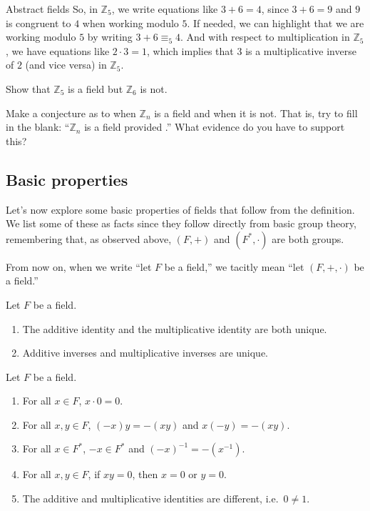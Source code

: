 \begin{section}{Abstract fields}
So, in $\mathbb{Z}_5$, we write equations like $3+6 = 4$, since $3+6 = 9$ and $9$ is congruent to $4$ when working modulo $5$. If needed, we can highlight that we are working modulo $5$ by writing  $3+6 \equiv_5 4$. And with respect to multiplication in $\mathbb{Z}_5$, we have equations like $2\cdot3 = 1$, which implies that $3$ is a multiplicative inverse of $2$ (and vice versa) in $\mathbb{Z}_5$.

\begin{problem}
Show that $\mathbb{Z}_5$ is a field but $\mathbb{Z}_6$ is not.
\end{problem}

\begin{problem}\label{prob.ConjectureZn}
Make a conjecture as to when $\mathbb{Z}_n$ is a field and when it is not. That is, try to fill in the blank: ``$\mathbb{Z}_n$ is a field provided .'' What evidence do you have to support this?
\end{problem}

\subsection{Basic properties}

Let's now explore some basic properties of fields that follow from the definition. We list some of these as facts since they follow directly from basic group theory, remembering that, as observed above, $(F,+)$ and $(F^*,\cdot)$ are both groups. 

From now on, when we write ``let $F$ be a field,'' we tacitly mean ``let $(F,+,\cdot)$ be a field.''

\begin{fact}\label{thm.BasicFieldPropsUniqueness}
Let $F$ be a field. 
\begin{enumerate}
\item The additive identity and the multiplicative identity are both unique.
\item Additive inverses and multiplicative inverses are unique.
\end{enumerate}
\end{fact}

\begin{theorem}\label{thm.BasicFieldProps}
Let $F$ be a field. 
\begin{enumerate}
\item For all $x\in F$, $x\cdot0 = 0$.
\item For all $x,y\in F$, $(-x)y = -(xy)$ and $x(-y) = -(xy)$.
\item For all $x\in F^*$, $-x\in F^*$ and $(-x)^{-1} = -(x^{-1})$.
\item\label{thm.BasicFieldProps.NoZeroDivisors} For all $x,y\in F$, if $xy = 0$, then $x=0$ or $y=0$.
\item The additive and multiplicative identities are different, i.e.~$0\neq 1$.
\end{enumerate}
\end{theorem}


\end{section}
